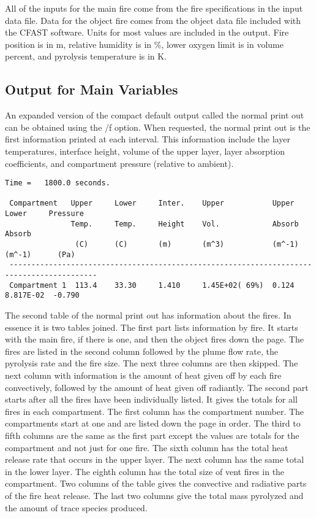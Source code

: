 All of the inputs for the main fire come from the fire specifications in the input data file. Data for the object fire comes from the object data file included with the CFAST software. Units for most values are included in the output.  Fire position is in m, relative humidity is in \%, lower oxygen limit is in volume percent, and pyrolysis temperature is in K.


\subsection{Output for Main Variables}

An expanded version of the compact default output called the normal print out can be obtained using the /f option.  When requested, the normal print out is the first information printed at each interval.  This information include the layer temperatures, interface height, volume of the upper layer, layer absorption coefficients, and compartment pressure (relative to ambient).

\begin{lstlisting}[basicstyle=\scriptsize]
 Time =   1800.0 seconds.

 Compartment   Upper     Lower     Inter.    Upper           Upper      Lower     Pressure
               Temp.     Temp.     Height    Vol.            Absorb     Absorb
                (C)      (C)       (m)       (m^3)           (m^-1)     (m^-1)      (Pa)
 ------------------------------------------------------------------------------------------
 Compartment 1  113.4    33.30     1.410     1.45E+02( 69%)  0.124      8.817E-02  -0.790
\end{lstlisting}
The second table of the normal print out has information about the fires.  In essence it is two tables joined.  The first part lists information by fire.  It starts with the main fire, if there is one, and then the object fires down the page.  The fires are listed in the second column followed by the plume flow rate, the pyrolysis rate and the fire size.  The next three columns are then skipped.  The next column with information is the amount of heat given off by each fire convectively, followed by the amount of heat given off radiantly.  The second part starts after all the fires have been individually listed.  It gives the totals for all fires in each compartment.  The first column has the compartment number.  The compartments start at one and are listed down the page in order.  The third to fifth columns are the same as the first part except the values are totals for the compartment and not just for one fire.  The sixth column has the total heat release rate that occurs in the upper layer.  The next column has the same total in the lower layer.  The eighth column has the total size of vent fires in the compartment.  Two columns of the table gives the convective and radiative parts of the fire heat release. The last two columns give the total mass pyrolyzed and the amount of trace species produced.

